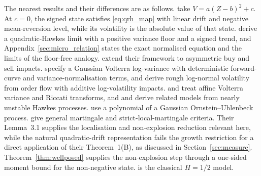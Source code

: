 The nearest results and their differences are as follows. \citet{GatheralJusselinRosenbaum2020} take $V=a(Z-b)^2+c$. At $c=0$, the signed state satisfies \eqref{eq:qrh_map} with linear drift and negative mean-reversion level, while its volatility is the absolute value of that state. \citet{DandapaniJusselinRosenbaum2021} derive a quadratic-Hawkes limit with a positive variance floor and a signed trend, and Appendix~\ref{sec:micro_relation} states the exact normalised equation and the limits of the floor-free analogy. \citet{ChudasamaIyer2025} extend their framework to asymmetric buy and sell impacts. \citet{BayerFrizGatheral2016} specify a Gaussian Volterra log-variance with deterministic forward-curve and variance-normalisation terms, and \citet{HagerHorstWagenhoferXu2026} derive rough log-normal volatility from order flow with additive log-volatility impacts. \citet{ElEuchRosenbaum2019} and \citet{AbiJaberLarssonPulido2019} treat affine Volterra variance and Riccati transforms, and \citet{JaissonRosenbaum2016} and \citet{ElEuchFukasawaRosenbaum2018} derive related models from nearly unstable Hawkes processes. \citet{AbiJaberIllandLi2022} use a polynomial of a Gaussian Ornstein--Uhlenbeck process. \citet{GuyonJeanninJourdain2026} give general martingale and strict-local-martingale criteria. Their Lemma~3.1 supplies the localisation and non-explosion reduction relevant here, while the natural quadratic-drift representation fails the growth restriction for a direct application of their Theorem~1(B), as discussed in Section~\ref{sec:measure}. Theorem~\ref{thm:wellposed} supplies the non-explosion step through a one-sided moment bound for the non-negative state. \citet{SeppRakhmonov2023} is the classical $H=1/2$ model.




